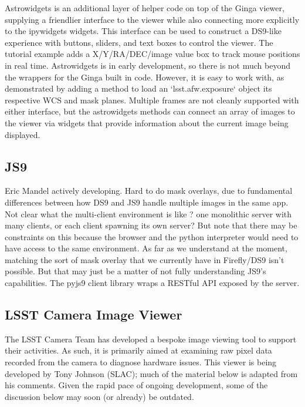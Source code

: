 Astrowidgets is an additional layer of helper code on top of the Ginga viewer, supplying a friendlier interface to the viewer while also connecting more explicitly to the ipywidgets widgets.  This interface can be used to construct a DS9-like experience with buttons, sliders, and text boxes to control the viewer.  The tutorial example adds a X/Y/RA/DEC/image value box to track mouse positions in real time.  Astrowidgets is in early development, so there is not much beyond the wrappers for the Ginga built in code.  However, it is easy to work with, as demonstrated by adding a method to load an `lsst.afw.exposure` object its respective WCS and mask planes.  Multiple frames are not cleanly supported with either interface, but the astrowidgets methods can connect an array of images to the viewer via widgets that provide information about the current image being displayed.

\subsection{JS9}

Eric Mandel actively developing.
Hard to do mask overlays, due to fundamental differences between how DS9 and JS9 handle multiple images in the same app.
Not clear what the multi-client environment is like ? one monolithic server with many clients, or each client spawning its own server?
But note that there may be constraints on this because the browser and the python interpreter would need to have access to the same environment.
As far as we understand at the moment, matching the sort of mask overlay that we currently have in Firefly/DS9 isn't possible.
But that may just be a matter of not fully understanding JS9's capabilities.
The pyjs9 client library wraps a RESTful API exposed by the server.


\subsection{LSST Camera Image Viewer}
\label{sec:existing_tools:camera}

The LSST Camera Team has developed a bespoke image viewing tool to support their activities.
As such, it is primarily aimed at examining raw pixel data recorded from the camera to diagnose hardware issues.
This viewer is being developed by Tony Johnson (SLAC); much of the material below is adapted from his comments.
Given the rapid pace of ongoing development, some of the discussion below may soon (or already) be outdated.

